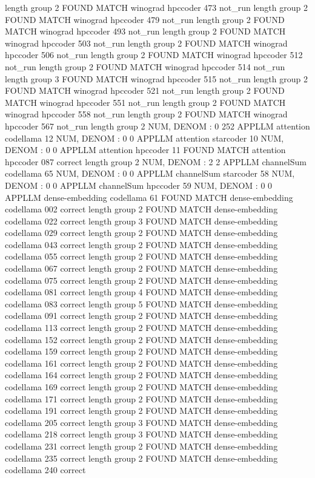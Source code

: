 length group  2
FOUND MATCH winograd hpccoder 473 not_run
length group  2
FOUND MATCH winograd hpccoder 479 not_run
length group  2
FOUND MATCH winograd hpccoder 493 not_run
length group  2
FOUND MATCH winograd hpccoder 503 not_run
length group  2
FOUND MATCH winograd hpccoder 506 not_run
length group  2
FOUND MATCH winograd hpccoder 512 not_run
length group  2
FOUND MATCH winograd hpccoder 514 not_run
length group  3
FOUND MATCH winograd hpccoder 515 not_run
length group  2
FOUND MATCH winograd hpccoder 521 not_run
length group  2
FOUND MATCH winograd hpccoder 551 not_run
length group  2
FOUND MATCH winograd hpccoder 558 not_run
length group  2
FOUND MATCH winograd hpccoder 567 not_run
length group  2
NUM, DENOM : 0 252
APPLLM attention codellama
12
NUM, DENOM : 0 0
APPLLM attention starcoder
10
NUM, DENOM : 0 0
APPLLM attention hpccoder
11
FOUND MATCH attention hpccoder 087 correct
length group  2
NUM, DENOM : 2 2
APPLLM channelSum codellama
65
NUM, DENOM : 0 0
APPLLM channelSum starcoder
58
NUM, DENOM : 0 0
APPLLM channelSum hpccoder
59
NUM, DENOM : 0 0
APPLLM dense-embedding codellama
61
FOUND MATCH dense-embedding codellama 002 correct
length group  2
FOUND MATCH dense-embedding codellama 022 correct
length group  3
FOUND MATCH dense-embedding codellama 029 correct
length group  2
FOUND MATCH dense-embedding codellama 043 correct
length group  2
FOUND MATCH dense-embedding codellama 055 correct
length group  2
FOUND MATCH dense-embedding codellama 067 correct
length group  2
FOUND MATCH dense-embedding codellama 075 correct
length group  2
FOUND MATCH dense-embedding codellama 081 correct
length group  4
FOUND MATCH dense-embedding codellama 083 correct
length group  5
FOUND MATCH dense-embedding codellama 091 correct
length group  2
FOUND MATCH dense-embedding codellama 113 correct
length group  2
FOUND MATCH dense-embedding codellama 152 correct
length group  2
FOUND MATCH dense-embedding codellama 159 correct
length group  2
FOUND MATCH dense-embedding codellama 161 correct
length group  2
FOUND MATCH dense-embedding codellama 164 correct
length group  2
FOUND MATCH dense-embedding codellama 169 correct
length group  2
FOUND MATCH dense-embedding codellama 171 correct
length group  2
FOUND MATCH dense-embedding codellama 191 correct
length group  2
FOUND MATCH dense-embedding codellama 205 correct
length group  3
FOUND MATCH dense-embedding codellama 218 correct
length group  3
FOUND MATCH dense-embedding codellama 231 correct
length group  2
FOUND MATCH dense-embedding codellama 235 correct
length group  2
FOUND MATCH dense-embedding codellama 240 correct
